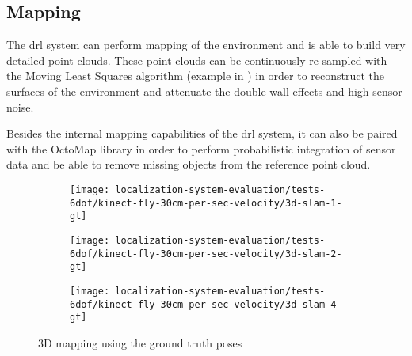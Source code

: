 \subsection{Mapping}

The \gls{drl} system can perform mapping of the environment and is able to build very detailed point clouds. These point clouds can be continuously re-sampled with the Moving Least Squares algorithm (example in ) in order to reconstruct the surfaces of the environment and attenuate the double wall effects and high sensor noise.

Besides the internal mapping capabilities of the \gls{drl} system, it can also be paired with the OctoMap \cite{Hornung2013} library in order to perform probabilistic integration of sensor data and be able to remove missing objects from the reference point cloud.


\begin{figure}[H]
	\centering
	\begin{subfigure}[ht]{0.4\textwidth}
		\centering
		\texttt{[image: localization-system-evaluation/tests-6dof/kinect-fly-30cm-per-sec-velocity/3d-slam-1-gt]}
	\end{subfigure}
	\begin{subfigure}[ht]{0.4\textwidth}
		\centering
		\texttt{[image: localization-system-evaluation/tests-6dof/kinect-fly-30cm-per-sec-velocity/3d-slam-2-gt]}
	\end{subfigure}
	\begin{subfigure}[ht]{0.4\textwidth}
		\centering
		\texttt{[image: localization-system-evaluation/tests-6dof/kinect-fly-30cm-per-sec-velocity/3d-slam-4-gt]}
	\end{subfigure}
	\caption{3D mapping using the ground truth poses}
	\label{fig:localization-system-evaluation_kinect-fly-30cm-per-sec-velocity-gt-slam}
\end{figure}


